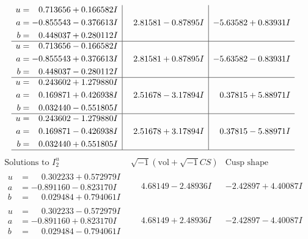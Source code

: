 \documentclass[1p]{elsarticle_modified}
\theoremstyle{definition}
\newcommand{\I}{\sqrt{-1}}
\begin{document}
$$\begin{array}{c|c|c}
\begin{aligned}
u &= \phantom{-}0.713656 + 0.166582 I \\
a &= -0.855543 - 0.376613 I \\
b &= \phantom{-}0.448037 + 0.280112 I\end{aligned}
 & \phantom{-}2.81581 - 0.87895 I & -5.63582 + 0.83931 I \\ \hline\begin{aligned}
u &= \phantom{-}0.713656 - 0.166582 I \\
a &= -0.855543 + 0.376613 I \\
b &= \phantom{-}0.448037 - 0.280112 I\end{aligned}
 & \phantom{-}2.81581 + 0.87895 I & -5.63582 - 0.83931 I \\ \hline\begin{aligned}
u &= \phantom{-}0.243602 + 1.279880 I \\
a &= \phantom{-}0.169871 + 0.426938 I \\
b &= \phantom{-}0.032440 - 0.551805 I\end{aligned}
 & \phantom{-}2.51678 - 3.17894 I & \phantom{-}0.37815 + 5.88971 I \\ \hline\begin{aligned}
u &= \phantom{-}0.243602 - 1.279880 I \\
a &= \phantom{-}0.169871 - 0.426938 I \\
b &= \phantom{-}0.032440 + 0.551805 I\end{aligned}
 & \phantom{-}2.51678 + 3.17894 I & \phantom{-}0.37815 - 5.88971 I\\
 \hline 
 \end{array}$$\newpage$$\begin{array}{c|c|c}  
\text{Solutions to }I^u_{2}& \I (\text{vol} + \sqrt{-1}CS) & \text{Cusp shape}\\
 \hline 
\begin{aligned}
u &= \phantom{-}0.302233 + 0.572979 I \\
a &= -0.891160 - 0.823170 I \\
b &= \phantom{-}0.029484 + 0.794061 I\end{aligned}
 & \phantom{-}4.68149 - 2.48936 I & -2.42897 + 4.40087 I \\ \hline\begin{aligned}
u &= \phantom{-}0.302233 - 0.572979 I \\
a &= -0.891160 + 0.823170 I \\
b &= \phantom{-}0.029484 - 0.794061 I\end{aligned}
 & \phantom{-}4.68149 + 2.48936 I & -2.42897 - 4.40087 I \\ \hline\begin{aligned}

\end{aligned}
\end{array}$$
\end{document}
